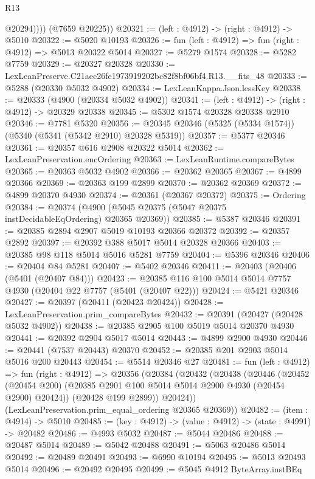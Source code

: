 \begin{lexlean}{R13}
\begin{coremodule}
              @20294))))
      (@7659 @20225))
@20321 := (left : @4912) -> (right : @4912) -> @5010
@20322 := @5020 @10193
@20326 := fun (left : @4912) => fun (right : @4912) => @5013 @20322 @5014
@20327 := @5279 @1574
@20328 := @5282 @7759
@20329 := @20327 @20328
@20330 := LexLeanPreserve.C21aec26fe1973919202bc82f8bf06bf4.R13.__fits_48
@20333 := @5288 (@20330 @5032 @4902)
@20334 := LexLeanKappa.Json.lessKey
@20338 := @20333 (@4900 (@20334 @5032 @4902))
@20341 := (left : @4912) -> (right : @4912) -> @20329 @20338
@20345 := @5302 @1574 @20328 @20338 @2910
@20346 := @7781 @5320
@20356 := @20345 @20346 (@5325 (@5334 @1574)) (@5340 (@5341 (@5342 @2910) @20328 @5319))
@20357 := @5377 @20346
@20361 := @20357 @616 @2908 @20322 @5014
@20362 := LexLeanPreservation.encOrdering
@20363 := LexLeanRuntime.compareBytes
@20365 := @20363 @5032 @4902
@20366 := @20362 @20365
@20367 := @4899 @20366
@20369 := @20363 @199 @2899
@20370 := @20362 @20369
@20372 := @4899 @20370 @4930
@20374 := @20361 (@20367 @20372)
@20375 := Ordering
@20384 := @20374 (@4900 (@5045 @20375 (@5047 @20375 instDecidableEqOrdering) @20365 @20369))
@20385 := @5387 @20346
@20391 := @20385 @2894 @2907 @5019 @10193 @20366 @20372
@20392 := @20357 @2892
@20397 := @20392 @388 @5017 @5014 @20328 @20366
@20403 := @20385 @98 @118 @5014 @5016 @5281 @7759
@20404 := @5396 @20346
@20406 := @20404 @84 @5281
@20407 := @5402 @20346
@20411 := @20403 (@20406 (@5401 (@20407 @84)))
@20423 := @20385 @116 @100 @5014 @5014 @7757 @4930 (@20404 @22 @7757 (@5401 (@20407 @22)))
@20424 := @5421 @20346
@20427 := @20397 (@20411 (@20423 @20424))
@20428 := LexLeanPreservation.prim_compareBytes
@20432 := @20391 (@20427 (@20428 @5032 @4902))
@20438 := @20385 @2905 @100 @5019 @5014 @20370 @4930
@20441 := @20392 @2904 @5017 @5014
@20443 := @4899 @2900 @4930
@20446 := @20441 (@7537 @20443) @20370
@20452 := @20385 @201 @2903 @5014 @5016 @200 @20443
@20454 := @5514 @20346 @27
@20481 := fun (left : @4912) =>
  fun (right : @4912) =>
  @20356
    (@20384
      (@20432
        (@20438
          (@20446
            (@20452 (@20454 @200) (@20385 @2901 @100 @5014 @5014 @2900 @4930 (@20454 @2900) @20424))
            (@20428 @199 @2899))
          @20424))
      (LexLeanPreservation.prim_equal_ordering @20365 @20369))
@20482 := (item : @4914) -> @5010
@20485 := (key : @4912) -> (value : @4912) -> (state : @4991) -> @20482
@20486 := @4993 @5032
@20487 := @5044 @20486
@20488 := @20487 @5014
@20489 := @5042 @20488
@20491 := @5063 @20486 @5014
@20492 := @20489 @20491
@20493 := @6990 @10194
@20495 := @5013 @20493 @5014
@20496 := @20492 @20495
@20499 := @5045 @4912 ByteArray.instBEq

\end{coremodule}
\end{lexlean}
